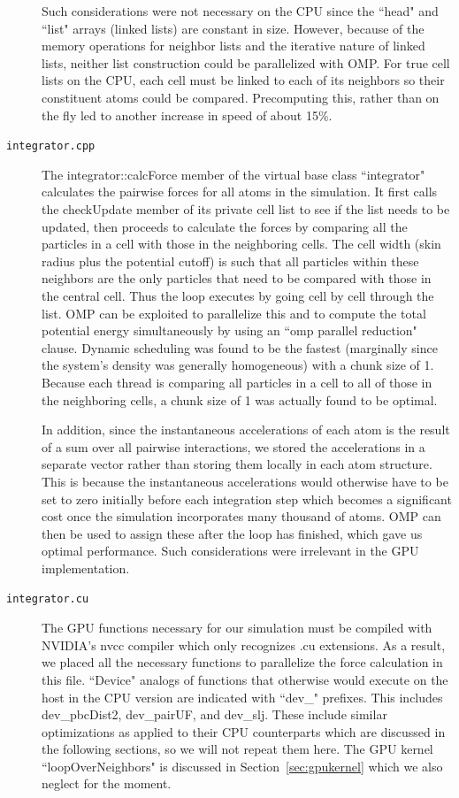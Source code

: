 \documentclass[12pt]{article}
\begin{document}
\begin{description}
Such considerations were not necessary on the CPU since the ``head" and ``list" arrays (linked lists) are constant in size.  However, because of the memory operations for neighbor lists and the iterative nature of linked lists, neither list construction could be parallelized with OMP.  For true cell lists on the CPU, each cell must be linked to each of its neighbors so their constituent atoms could be compared.  Precomputing this, rather than on the fly led to another increase in speed of about 15\%.

\item[\texttt{integrator.cpp}] 
The integrator::calcForce member of the virtual base class ``integrator" calculates the pairwise forces for all atoms in the simulation.  It first calls the checkUpdate member of its private cell list to see if the list needs to be updated, then proceeds to calculate the forces by comparing all the particles in a cell with those in the neighboring cells.  The cell width (skin radius plus the potential cutoff) is such that all particles within these neighbors are the only particles that need to be compared with those in the central cell.  Thus the loop executes by going cell by cell through the list.  OMP can be exploited to parallelize this and to compute the total potential energy simultaneously by using an ``omp parallel reduction" clause.  Dynamic scheduling was found to be the fastest (marginally since the system's density was generally homogeneous) with a chunk size of 1.  Because each thread is comparing all particles in a cell to all of those in the neighboring cells, a chunk size of 1 was actually found to be optimal.  

In addition, since the instantaneous accelerations of each atom is the result of a sum over all pairwise interactions, we stored the accelerations in a separate vector rather than storing them locally in each atom structure.  This is because the instantaneous accelerations would otherwise have to be set to zero initially before each integration step which becomes a significant cost once the simulation incorporates many thousand of atoms.  OMP can then be used to assign these after the loop has finished, which gave us optimal performance.  Such considerations were irrelevant in the GPU implementation.

\item[\texttt{integrator.cu}] 
The GPU functions necessary for our simulation must be compiled with NVIDIA's nvcc compiler which only recognizes .cu extensions.  As a result, we placed all the necessary functions to parallelize the force calculation in this file.  ``Device" analogs of functions that otherwise would execute on the host in the CPU version are indicated with ``dev\_" prefixes.  This includes dev\_pbcDist2, dev\_pairUF, and dev\_slj.  These include similar optimizations as applied to their CPU counterparts which are discussed in the following sections, so we will not repeat them here.  The GPU kernel ``loopOverNeighbors" is discussed in Section~\ref{sec:gpukernel} which we also neglect for the moment.  


\end{description}
\end{document}
